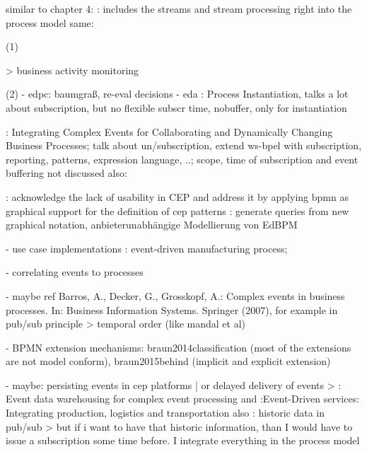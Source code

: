 similar to chapter 4:
\cite{appel2014modeling}: includes the streams and stream processing right into the process model
same: \cite{biornstad2006control}




(1)

> business activity monitoring



(2)
- edpc: baumgraß, re-eval decisions
- eda
\cite{decker2008instantiation}: Process Instantiation, talks a lot about subscription, but no flexible subscr time, nobuffer, only for instantiation

\cite{von2010integrating}: Integrating Complex Events for Collaborating and Dynamically Changing Business Processes; talk about un/subscription, extend ws-bpel with subscription, reporting, patterns, expression language, ..; scope, time of subscription and event buffering not discussed
also: \cite{juric2010wsdl}

\cite{Kunz2010}: acknowledge the lack of usability in CEP and address it by applying bpmn as graphical support for the definition of cep patterns
\cite{gabriel2016konzeptionelle}: generate queries from new graphical notation, anbieterunabhängige Modellierung von EdBPM


- use case implementations
\cite{estruch2012event}: event-driven manufacturing process; 


- correlating events to processes

- maybe ref Barros, A., Decker, G., Grosskopf, A.: Complex events in business processes. In: Business Information Systems. Springer (2007), for example in pub/sub principle > temporal order (like mandal et al)

- BPMN extension mechanisms: braun2014classification (most of the extensions are not model conform), braun2015behind (implicit and explicit extension)

- maybe: persisting events in cep platforms | or delayed delivery of events
> \cite{roth2010event}: Event data warehousing for complex event processing and \cite{buchmann2010event}:Event-Driven services: Integrating production, logistics and transportation
also \cite{li2007historic}: historic data in pub/sub
> but if i want to have that historic information, than I would have to issue a subscription some time before. I integrate everything in the process model


